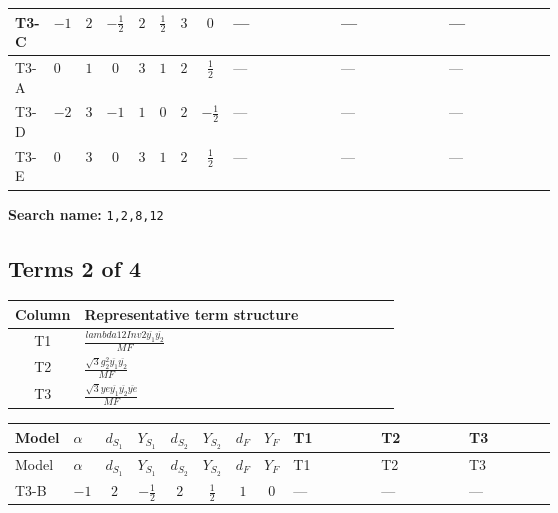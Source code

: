 \documentclass[8pt]{article}
\begin{document}
\begin{landscape}
\begin{longtable}{@{}llcccccc >{\raggedright\arraybackslash}p{0.21\linewidth} >{\raggedright\arraybackslash}p{0.21\linewidth} >{\raggedright\arraybackslash}p{0.21\linewidth}@{}}
\midrule
T3-C & $-1$ & $2$ & $-\frac{1}{2}$ & $2$ & $\frac{1}{2}$ & $3$ & $0$ & --- & --- & --- \\
\midrule
T3-A & $0$ & $1$ & $0$ & $3$ & $1$ & $2$ & $\frac{1}{2}$ & --- & --- & --- \\
\midrule
T3-D & $-2$ & $3$ & $-1$ & $1$ & $0$ & $2$ & $-\frac{1}{2}$ & --- & --- & --- \\
\midrule
T3-E & $0$ & $3$ & $0$ & $3$ & $1$ & $2$ & $\frac{1}{2}$ & --- & --- & --- \\
\midrule
\bottomrule
\end{longtable}
\clearpage
\noindent\textbf{Search name: }\texttt{1,2,8,12}\par\smallskip
\subsection*{Terms 2 of 4}
\begin{center}
\begin{tabular}{@{}c >{\raggedright\arraybackslash}p{0.82\linewidth}@{}}
\toprule
Column & Representative term structure \\
\midrule
T1 & \(\displaystyle \frac{lambda12Inv2 \overline{y_{1}} \overline{y_{2}}}{MF}\) \\
\midrule
T2 & \(\displaystyle \frac{\sqrt{3} g_{2}^{2} \overline{y_{1}} \overline{y_{2}}}{MF}\) \\
\midrule
T3 & \(\displaystyle \frac{\sqrt{3} ye \overline{y_{1}} \overline{y_{2}} \overline{ye}}{MF}\) \\
\midrule
\bottomrule
\end{tabular}
\end{center}
\smallskip
\tiny
\begin{longtable}{@{}llcccccc >{\raggedright\arraybackslash}p{0.21\linewidth} >{\raggedright\arraybackslash}p{0.21\linewidth} >{\raggedright\arraybackslash}p{0.21\linewidth}@{}}
\toprule
Model & $\alpha$ & $d_{S_1}$ & $Y_{S_1}$ & $d_{S_2}$ & $Y_{S_2}$ & $d_F$ & $Y_F$ & T1 & T2 & T3 \\
\midrule
\endfirsthead
\toprule
Model & $\alpha$ & $d_{S_1}$ & $Y_{S_1}$ & $d_{S_2}$ & $Y_{S_2}$ & $d_F$ & $Y_F$ & T1 & T2 & T3 \\
\midrule
\endhead
T3-B & $-1$ & $2$ & $-\frac{1}{2}$ & $2$ & $\frac{1}{2}$ & $1$ & $0$ & --- & --- & --- \\
\midrule

\end{longtable}
\end{landscape}
\end{document}
